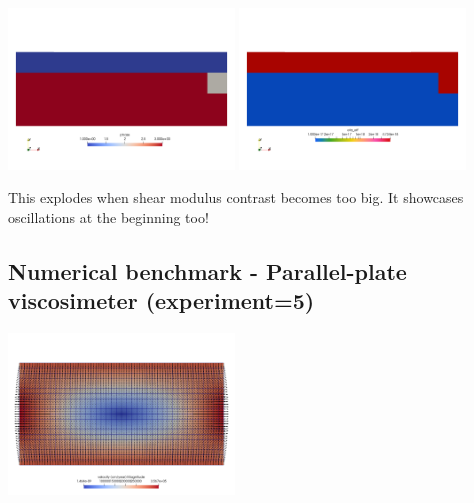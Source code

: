 \begin{center}
\includegraphics[width=6cm]{python_codes/fieldstone_129/results/experiment4/phases}
\includegraphics[width=6cm]{python_codes/fieldstone_129/results/experiment4/eta_eff}
\end{center}

This explodes when shear modulus contrast becomes too big.
It showcases oscillations at the beginning too!


\subsection*{Numerical benchmark - Parallel-plate viscosimeter (experiment=5)}

\begin{center}
\includegraphics[width=6cm]{python_codes/fieldstone_129/results/experiment5/setup}
\end{center}


